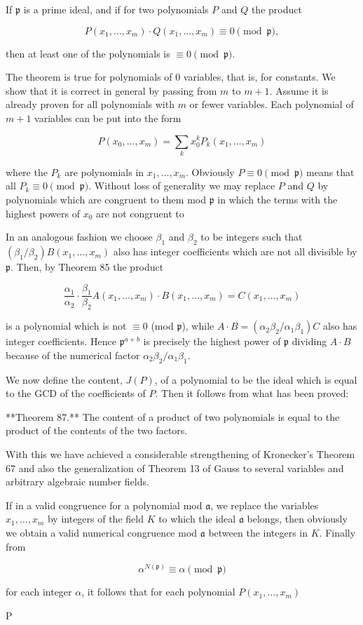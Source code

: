 If $\mathfrak{p}$ is a prime ideal, and if for two polynomials $P$ and $Q$ the product

$$P(x_1, \ldots, x_m) \cdot Q(x_1, \ldots, x_m) \equiv 0 \pmod{\mathfrak{p}},$$

then at least one of the polynomials is $\equiv 0 \pmod{\mathfrak{p}}$.

The theorem is true for polynomials of 0 variables, that is, for constants. We show that it is correct in general by passing from $m$ to $m + 1$. Assume it is already proven for all polynomials with $m$ or fewer variables. Each polynomial of $m + 1$ variables can be put into the form

$$P(x_0, \ldots, x_m) = \sum_k x_0^k P_k(x_1, \ldots, x_m)$$

where the $P_k$ are polynomials in $x_1, \ldots, x_m$. Obviously $P \equiv 0 \pmod{\mathfrak{p}}$ means that all $P_k \equiv 0 \pmod{\mathfrak{p}}$. Without loss of generality we may replace $P$ and $Q$ by polynomials which are congruent to them mod $\mathfrak{p}$ in which the terms with the highest powers of $x_0$ are not congruent to

In an analogous fashion we choose $\beta_1$ and $\beta_2$ to be integers such that $(\beta_1/\beta_2)B(x_1, \ldots, x_m)$ also has integer coefficients which are not all divisible by $\mathfrak{p}$. Then, by Theorem 85 the product

$$\frac{\alpha_1}{\alpha_2} \cdot \frac{\beta_1}{\beta_2} A(x_1, \ldots, x_m) \cdot B(x_1, \ldots, x_m) = C(x_1, \ldots, x_m)$$

is a polynomial which is not $\equiv 0$ (mod $\mathfrak{p}$), while $A \cdot B = (\alpha_2 \beta_2/\alpha_1 \beta_1)C$ also has integer coefficients. Hence $\mathfrak{p}^{a+b}$ is precisely the highest power of $\mathfrak{p}$ dividing $A \cdot B$ because of the numerical factor $\alpha_2 \beta_2/\alpha_1 \beta_1$.

We now define the content, $J(P)$, of a polynomial to be the ideal which is equal to the GCD of the coefficients of $P$. Then it follows from what has been proved:

**Theorem 87.** The content of a product of two polynomials is equal to the product of the contents of the two factors.

With this we have achieved a considerable strengthening of Kronecker’s Theorem 67 and also the generalization of Theorem 13 of Gauss to several variables and arbitrary algebraic number fields.

If in a valid congruence for a polynomial mod $\mathfrak{a}$, we replace the variables $x_1, \ldots, x_m$ by integers of the field $K$ to which the ideal $\mathfrak{a}$ belongs, then obviously we obtain a valid numerical congruence mod $\mathfrak{a}$ between the integers in $K$. Finally from

$$\alpha^{N(\mathfrak{p})} \equiv \alpha \pmod{\mathfrak{p}}$$

for each integer $\alpha$, it follows that for each polynomial $P(x_1, \ldots, x_m)$

$$P
